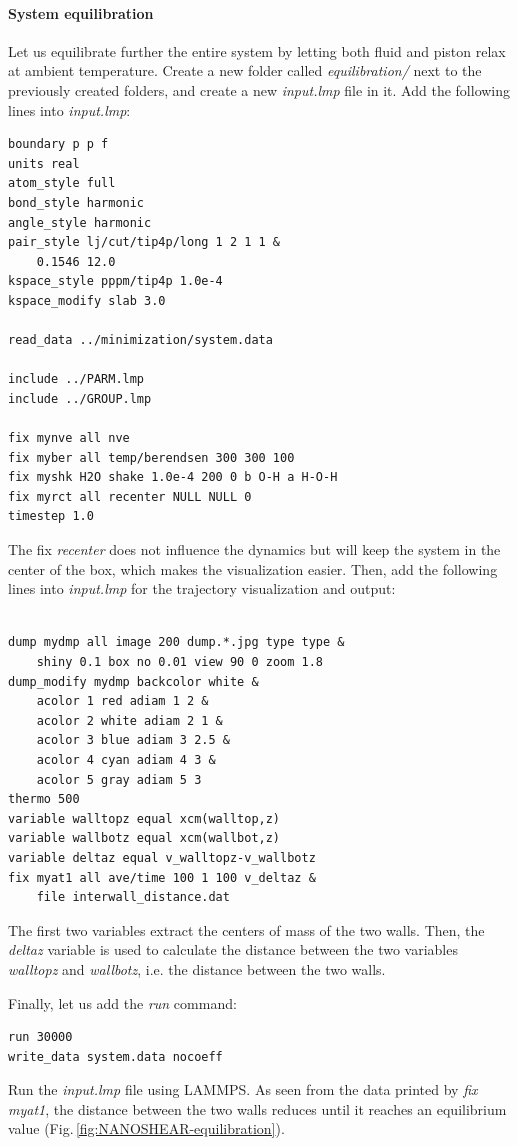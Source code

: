 \documentclass[9pt,tutorial]{livecoms}
\begin{document}
\paragraph{System equilibration}
Let us equilibrate further the entire system by letting both fluid and piston
relax at ambient temperature. Create a new folder called \textit{equilibration/}
next to the previously created folders, and create a new \textit{input.lmp}
file in it. Add the following lines into \textit{input.lmp}:
{\normalsize \begin{verbatim}
boundary p p f
units real
atom_style full
bond_style harmonic
angle_style harmonic
pair_style lj/cut/tip4p/long 1 2 1 1 &
    0.1546 12.0
kspace_style pppm/tip4p 1.0e-4
kspace_modify slab 3.0

read_data ../minimization/system.data

include ../PARM.lmp
include ../GROUP.lmp

fix mynve all nve
fix myber all temp/berendsen 300 300 100
fix myshk H2O shake 1.0e-4 200 0 b O-H a H-O-H
fix myrct all recenter NULL NULL 0
timestep 1.0
\end{verbatim}}
The fix \textit{recenter} does not influence the dynamics but will keep the
system in the center of the box, which makes the
visualization easier. Then, add the following lines into \textit{input.lmp}
for the trajectory visualization and output:
{\normalsize \begin{verbatim}

dump mydmp all image 200 dump.*.jpg type type &
    shiny 0.1 box no 0.01 view 90 0 zoom 1.8
dump_modify mydmp backcolor white &
    acolor 1 red adiam 1 2 &
    acolor 2 white adiam 2 1 &
    acolor 3 blue adiam 3 2.5 &
    acolor 4 cyan adiam 4 3 &
    acolor 5 gray adiam 5 3
thermo 500
variable walltopz equal xcm(walltop,z)
variable wallbotz equal xcm(wallbot,z)
variable deltaz equal v_walltopz-v_wallbotz
fix myat1 all ave/time 100 1 100 v_deltaz &
    file interwall_distance.dat
\end{verbatim}}
The first two variables extract the centers of mass of the two walls. Then,
the \textit{deltaz} variable is used to calculate the distance between the two
variables \textit{walltopz} and \textit{wallbotz}, i.e. the distance between the two walls.

Finally, let us add the \textit{run} command:
{\normalsize \begin{verbatim}
run 30000
write_data system.data nocoeff
\end{verbatim}}
Run the \textit{input.lmp} file using LAMMPS. As seen from the data printed by
\textit{fix myat1}, the distance between the two walls reduces until it reaches
an equilibrium value (Fig.\,\ref{fig:NANOSHEAR-equilibration}).
\end{document}
